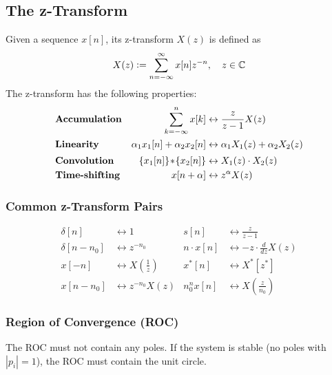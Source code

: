 \subsection{The z-Transform}
    Given a sequence $x[n]$, its z-transform $X(z)$ is defined as
    \begin{align*}
        X(z) \vcentcolon= \sum\limits_{n = -\infty}^\infty x[n] z^{-n}, \quad z \in \mathbb{C}
    \end{align*}
    The z-transform has the following properties:
    \begin{align*}
        &\text{\bf Accumulation} & \sum_{k = -\infty}^n x[k] &\leftrightarrow \frac{z}{z-1}X(z) \\
        &\text{\bf Linearity} & \alpha_1x_1[n] + \alpha_2x_2[n] &\leftrightarrow \alpha_1X_1(z) + \alpha_2X_2(z) \\[2pt]
        &\text{\bf Convolution} & \{x_1[n]\} \!\ast\! \{x_2[n]\} &\leftrightarrow X_1(z)\cdot X_2(z) \\
        &\text{\bf Time-shifting} &  x[n+\alpha] &\leftrightarrow z^\alpha X(z)
    \end{align*}

\subsubsection{Common z-Transform Pairs}
    \vspace{-1em}
    \begin{align*}
        \delta[n] &\longleftrightarrow 1 & s[n] &\longleftrightarrow \tfrac{z}{z-1}\\
        \delta[n-n_0] &\longleftrightarrow z^{-n_0} & n \cdot x[n] &\longleftrightarrow - z \cdot \frac{d}{dz} X(z)\\  %
        x[-n] &\longleftrightarrow X\!\!\left(\tfrac{1}{z}\right) & x^*[n] &\longleftrightarrow X^*[z^*] \\
        x[n-n_0] &\longleftrightarrow z^{-n_0}X(z) & n_0^nx[n] &\longleftrightarrow X\!\!\left(\tfrac{z}{n_0}\right)
    \end{align*}

\subsubsection{Region of Convergence (ROC)}
    The ROC must not contain any poles. If the system is stable (no poles with $|p_i| = 1$), the ROC must contain the unit circle.

